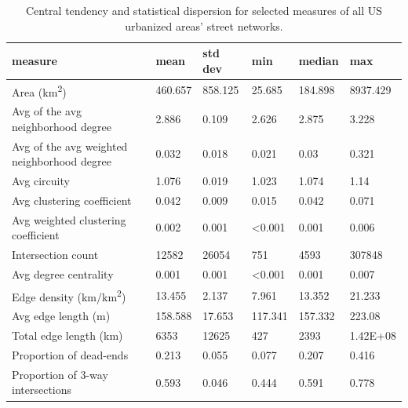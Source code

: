 \documentclass{article}
\begin{document}
\begin{table}
\centering
\caption{Central tendency and statistical dispersion for selected measures of all US urbanized areas' street networks.}
\label{table01}
\begin{tabular}{llllll}
	\toprule
	measure                                     & mean           & std dev        & min            & median         & max            \\
	\midrule
	Area (km\textsuperscript{2})                                  & 460.657        & 858.125        & 25.685         & 184.898        & 8937.429       \\
	Avg of the avg neighborhood degree          & 2.886          & 0.109          & 2.626          & 2.875          & 3.228          \\
	Avg of the avg weighted neighborhood degree & 0.032          & 0.018          & 0.021          & 0.03           & 0.321          \\
	Avg circuity                                & 1.076          & 0.019          & 1.023          & 1.074          & 1.14           \\
	Avg clustering coefficient                  & 0.042          & 0.009          & 0.015          & 0.042          & 0.071          \\
	Avg weighted clustering coefficient         & 0.002          & 0.001          & \textless0.001 & 0.001          & 0.006          \\
	Intersection count                          & 12582          & 26054          & 751            & 4593           & 307848         \\
	Avg degree centrality                       & 0.001          & 0.001          & \textless0.001 & 0.001          & 0.007          \\
	Edge density (km/km\textsuperscript{2})                       & 13.455         & 2.137          & 7.961          & 13.352         & 21.233         \\
	Avg edge length (m)                         & 158.588        & 17.653         & 117.341        & 157.332        & 223.08         \\
	Total edge length (km)                      & 6353           & 12625          & 427            & 2393           & 1.42E+08       \\
	Proportion of dead-ends                     & 0.213          & 0.055          & 0.077          & 0.207          & 0.416          \\
	Proportion of 3-way intersections           & 0.593          & 0.046          & 0.444          & 0.591          & 0.778          \\

\end{tabular}
\end{table}
\end{document}
